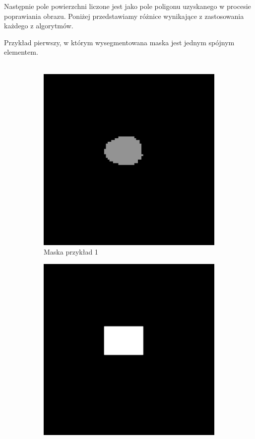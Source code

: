 \documentclass[a4paper,11pt,twoside]{report}
\theoremstyle{definition}
\begin{document}
Następnie pole powierzchni liczone jest jako pole poligonu uzyskanego w procesie poprawiania obrazu. Poniżej przedstawiamy różnice wynikające z zastosowania każdego z algorytmów.

Przykład pierwszy, w którym wysegmentowana maska jest jednym spójnym elementem. \\ \\


\begin{figure}[htb]
	\centering %
	\begin{subfigure}{0.25\textwidth}
		\includegraphics[width=\linewidth]{Mask/1/maska.png}
		\caption{Maska przykład 1}
		\label{fig:1}
	\end{subfigure}\hfil %
	\begin{subfigure}{0.25\textwidth}
		\includegraphics[width=\linewidth]{Mask/1/square.png}

\end{subfigure}
\end{figure}
\end{document}
